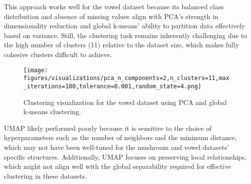 This approach works well for the vowel dataset because its balanced class distribution and absence of missing values align with PCA’s strength in dimensionality reduction and global k-means’ ability to partition data effectively based on variance. Still, the clustering task remains inherently challenging due to the high number of clusters (11) relative to the dataset size, which makes fully cohesive clusters difficult to achieve.

\begin{figure}[h!]
    \centering
    \texttt{[image: figures/visualizations/pca\_n\_components=2,n\_clusters=11,max\_iterations=100,tolerance=0.001,random\_state=4.png]}
    \caption{Clustering visualization for the vowel dataset using PCA and global k-means clustering.}
    \label{fig:vowel_clustering}
\end{figure}

UMAP likely performed poorly because it is sensitive to the choice of hyperparameters such as the number of neighbors and the minimum distance, which may not have been well-tuned for the mushroom and vowel datasets' specific structures. Additionally, UMAP focuses on preserving local relationships, which might not align well with the global separability required for effective clustering in these datasets.
